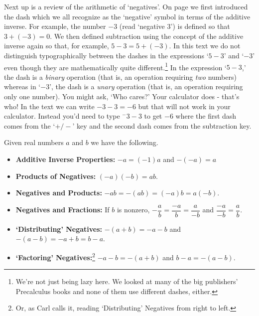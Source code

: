 Next up is a review of the arithmetic of `negatives'. On page \pageref{realnumberaddition} we first introduced the dash which we all recognize as the `negative' symbol in terms of the additive inverse.  For example, the number $-3$ (read `negative $3$') is defined so that $3 + (-3) = 0$.  We then defined subtraction using the concept of the additive inverse again so that, for example, $5 - 3 = 5 + (-3)$.  In this text we do not distinguish typographically between the dashes in the expressions `$5-3$' and `$-3$' even though they are mathematically quite different.\footnote{We're not just being lazy here.  We looked at many of the big publishers' Precalculus books and none of them use different dashes, either.} In the expression `$5-3$,' the dash is a \textit{binary} operation (that is, an operation requiring \textit{two} numbers) whereas in `$-3$', the dash is a \textit{unary} operation (that is, an operation requiring only one number).  You might ask, `Who cares?'  Your calculator does - that's who!  In the text we can write $-3 - 3 = -6$ but that will not work in your calculator.  Instead you'd need to type $^{-}3 - 3$ to get $-6$ where the first dash comes from the `$+/-$' key and the second dash comes from the subtraction key.

\medskip

\label{propertiesofnegatives}

 \colorbox{ResultColor}{\bbm
\begin{thm}
\smallskip
Given real numbers $a$ and $b$ we have the following.  

\begin{itemize}

\item  \textbf{Additive Inverse Properties:}  $-a = (-1)a$ and $-(-a) = a$

\item  \textbf{Products of Negatives:} $(-a)(-b) = ab$. 

\item  \textbf{Negatives and Products:} $-ab = -(ab) = (-a)b = a(-b)$.

\item  \textbf{Negatives and Fractions:} If $b$ is nonzero, $-\dfrac{a}{b} = \dfrac{-a}{b} = \dfrac{a}{-b}$ and $\dfrac{-a}{-b} = \dfrac{a}{b}$.

\item  \textbf{`Distributing' Negatives:}  $-(a+b) = -a-b$ and $-(a-b) = -a + b = b-a$.

\item  \textbf{`Factoring' Negatives:}\footnote{Or, as Carl calls it, reading `Distributing' Negatives from right to left.} $-a-b = -(a+b)$ and $b-a = -(a-b)$.

\end{itemize}
\end{thm}
\ebm}


